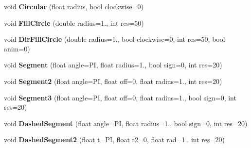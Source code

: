 \begin{DoxyCompactItemize}
\item 
\hypertarget{namespacevsr_1_1_g_l_1_1_glyph_ad5920dc71181e780d7489785b5aa1055}{void {\bfseries Circular} (float radius, bool clockwise=0)}\label{namespacevsr_1_1_g_l_1_1_glyph_ad5920dc71181e780d7489785b5aa1055}

\item 
\hypertarget{namespacevsr_1_1_g_l_1_1_glyph_aeb029a00f53223c5b5a74198df79f642}{void {\bfseries Fill\-Circle} (double radius=1., int res=50)}\label{namespacevsr_1_1_g_l_1_1_glyph_aeb029a00f53223c5b5a74198df79f642}

\item 
\hypertarget{namespacevsr_1_1_g_l_1_1_glyph_aa30218394d3226276d900666aced65df}{void {\bfseries Dir\-Fill\-Circle} (double radius=1., bool clockwise=0, int res=50, bool anim=0)}\label{namespacevsr_1_1_g_l_1_1_glyph_aa30218394d3226276d900666aced65df}

\item 
\hypertarget{namespacevsr_1_1_g_l_1_1_glyph_a86efee94b9bb5c5bf11f9a188afef5bb}{void {\bfseries Segment} (float angle=P\-I, float radius=1., bool sign=0, int res=20)}\label{namespacevsr_1_1_g_l_1_1_glyph_a86efee94b9bb5c5bf11f9a188afef5bb}

\item 
\hypertarget{namespacevsr_1_1_g_l_1_1_glyph_a9261e2f88e39b3f37506378b3a96b5e2}{void {\bfseries Segment2} (float angle=P\-I, float off=0, float radius=1., int res=20)}\label{namespacevsr_1_1_g_l_1_1_glyph_a9261e2f88e39b3f37506378b3a96b5e2}

\item 
\hypertarget{namespacevsr_1_1_g_l_1_1_glyph_a2a48606ea0040a1eaf6f7ca18a527452}{void {\bfseries Segment3} (float angle=P\-I, float off=0, float radius=1., bool sign=0, int res=20)}\label{namespacevsr_1_1_g_l_1_1_glyph_a2a48606ea0040a1eaf6f7ca18a527452}

\item 
\hypertarget{namespacevsr_1_1_g_l_1_1_glyph_a3667ac84e2a598204a78e5aff309224b}{void {\bfseries Dashed\-Segment} (float angle=P\-I, float radius=1., bool sign=0, int res=20)}\label{namespacevsr_1_1_g_l_1_1_glyph_a3667ac84e2a598204a78e5aff309224b}

\item 
\hypertarget{namespacevsr_1_1_g_l_1_1_glyph_a7276be6e6b4b776cb8843a277e2523e2}{void {\bfseries Dashed\-Segment2} (float t=P\-I, float t2=0, float rad=1., int res=20)}\label{namespacevsr_1_1_g_l_1_1_glyph_a7276be6e6b4b776cb8843a277e2523e2}


\end{DoxyCompactItemize}
